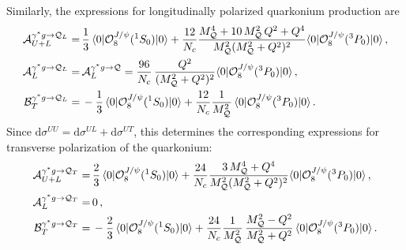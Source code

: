 \documentclass[prd,aps,preprintnumbers,nofootinbib,superscriptaddress]{revtex4}
\renewcommand{\d}{\mathrm{d}}
\begin{document}
Similarly, the expressions for longitudinally polarized quarkonium production are
\begin{align}
{\cal A}_{U+L}^{\gamma^{*}g\to{\cal Q}_L}= &\, \frac{1}{3}\, \langle0\vert{\cal O}_{8}^{J/\psi}(^{1}S_{0})\vert0\rangle+\frac{12}{N_{c}}\frac{M_{{\cal Q}}^{4}+ 10 \, M_{\cal Q}^2\,  Q^2+Q^{4}}{M_{{\cal Q}}^{2}(M_{{\cal Q}}^{2}+Q^{2})^2}\langle0\vert{\cal O}_{8}^{J/\psi}(^{3}P_{0})\vert0\rangle\,,
\label{eq:AUL_L}\\
{\cal A}_{L}^{\gamma^{*}g\to{\cal Q}_L}=  &\,   {\cal A}_{L}^{\gamma^{*}g\to{\cal Q}} = \frac{96}{N_{c}}\,\frac{Q^{2}}{(M_{{\cal Q}}^{2}+Q^{2})^{2}}\langle0\vert{\cal O}_{8}^{J/\psi}(^{3}P_{0})\vert0\rangle\,, \\
{\cal B}_{T}^{\gamma^{*}g\to{\cal Q}_L}= & \, -\frac{1}{3}\, \langle0\vert{\cal O}_{8}^{J/\psi}(^{1}S_{0})\vert0\rangle+\frac{12}{N_{c}}\frac{1}{M_{{\cal Q}}^{2}} \, \langle0\vert{\cal O}_{8}^{J/\psi}(^{3}P_{0})\vert0\rangle\, .
\end{align}
Since $\d\sigma^{UU} = \d\sigma^{UL}+\d\sigma^{UT}$, this determines the corresponding expressions for transverse polarization of the quarkonium:
\begin{align}
{\cal A}_{U+L}^{\gamma^{*}g\to{\cal Q}_T}= &\, \frac{2}{3}\, \langle0\vert{\cal O}_{8}^{J/\psi}(^{1}S_{0})\vert0\rangle+\frac{24}{N_{c}}\frac{3\, M_{{\cal Q}}^{4}+Q^{4}}{M_{{\cal Q}}^{2}(M_{{\cal Q}}^{2}+Q^{2})^2}\langle0\vert{\cal O}_{8}^{J/\psi}(^{3}P_{0})\vert0\rangle\,,\\
{\cal A}_{L}^{\gamma^{*}g\to{\cal Q}_T}=  &\,  0\, ,\\
{\cal B}_{T}^{\gamma^{*}g\to{\cal Q}_T}= & \, -\frac{2}{3}\, \langle0\vert{\cal O}_{8}^{J/\psi}(^{1}S_{0})\vert0\rangle+ \frac{24}{N_{c}}\frac{1}{M_{{\cal Q}}^{2}} \,  \frac{M_{\cal Q}^2-Q^2}{M_{\cal Q}^2+Q^2} \, \langle0\vert{\cal O}_{8}^{J/\psi}(^{3}P_{0})\vert0\rangle\, .
\end{align}
\end{document}

